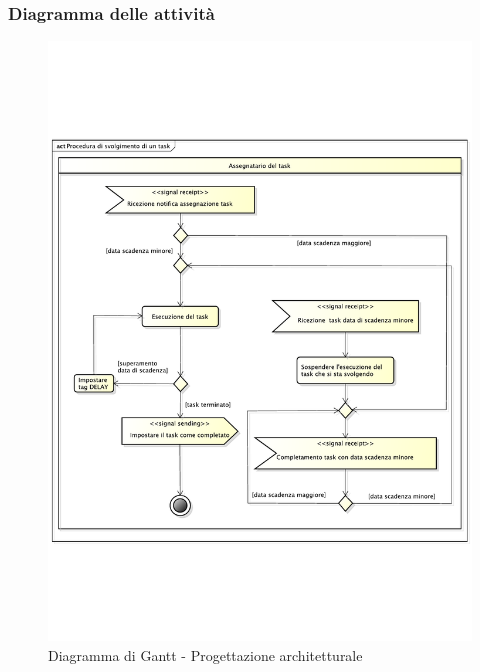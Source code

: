 		\subsubsection{Diagramma delle attività} %
		\label{ssub:diagramma_delle_attivita}
			\begin{figure}[htbp]
				\centering
				\includegraphics[width=14cm]{images/proc_svolgimento_task.pdf}
				\caption{Diagramma di Gantt - Progettazione architetturale}
				\label{fig:gantt_prog_architetturale}				
			\end{figure}
	
